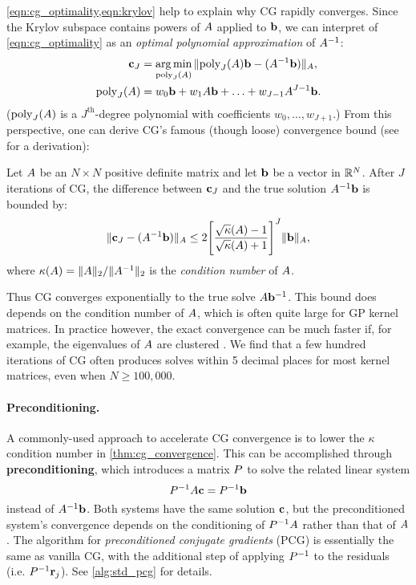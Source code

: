 \cref{eqn:cg_optimality,eqn:krylov} help to explain why CG rapidly converges.
Since the Krylov subspace contains powers of $A$ applied to $\mathbf{b}$, we can interpret of \cref{eqn:cg_optimality} as an \emph{optimal polynomial approximation} of $A^{-1}$:
%
\begin{align*}
  \mathbf{c}_J &= \operatorname*{arg\,min}_{\text{poly}_J(A)} \Vert \text{poly}_J(A)\mathbf{b} - (A^{-1} \mathbf{b}) \Vert_{A},
  \\
  \text{poly}_J(A) &= w_0 \mathbf{b} + w_1 A \mathbf{b} + \ldots + w_{J-1} A^{J-1} \mathbf{b}.
\end{align*}
%
($\text{poly}_J(A)$ is a $J^\text{th}$-degree polynomial with coefficients $w_0, \ldots, w_{J+1}$.)
From this perspective, one can derive CG's famous (though loose) convergence bound (see \citep{shewchuk1994introduction} for a derivation):
%
\begin{theorem}[Convergence of CG]
  \label{thm:cg_convergence}
  Let $A$ be an $N \times N$ positive definite matrix and let $\mathbf{b}$ be a vector in $\mathbb{R}^N$.
  After $J$ iterations of CG, the difference between $\mathbf{c}_J$ and the true solution $A^{-1} \mathbf{b}$ is bounded by:
  \begin{equation*}
    \Vert \mathbf{c}_J - (A^{-1} \mathbf{b}) \Vert_{A}
    \leq
    2 \Bigg[ \frac{ \sqrt \kappa(A) - 1 }{\sqrt \kappa(A) + 1} \Biggr]^J \Vert \mathbf{b} \Vert_{A},
  \end{equation*}
  where $\kappa(A) = \Vert A \Vert_2 / \Vert A^{-1} \Vert_2$ is the \emph{condition number} of $A$.
\end{theorem}
%
Thus CG converges exponentially to the true solve $A \mathbf{b}^{-1}$.
This bound does depends on the condition number of $A$, which is often quite large for GP kernel matrices.
In practice however, the exact convergence can be much faster if, for example, the eigenvalues of $A$ are clustered \cite{saad2003iterative}.
We find that a few hundred iterations of CG often produces solves within 5 decimal places for most kernel matrices, even when $N \geq 100,\!000$.

\paragraph{Preconditioning.}
A commonly-used approach to accelerate CG convergence is to lower the $\kappa$ condition number in \cref{thm:cg_convergence}.
This can be accomplished through {\bf preconditioning}, which introduces a matrix $P$ to solve the related linear system
%
\[
  P^{-1} A \mathbf{c} = P^{-1} \mathbf{b}
\]
%
instead of $A^{-1} \mathbf{b}$.
Both systems have the same solution $\mathbf{c}$, but the preconditioned system's convergence depends on the conditioning of $P^{-1} A$ rather than that of $A$.
The algorithm for \emph{preconditioned conjugate gradients} (PCG) is essentially the same as vanilla CG, with the additional step of applying $P^{-1}$ to the residuals (i.e. $P^{-1} \mathbf{r}_j$).
See \autoref{alg:std_pcg} for details.

